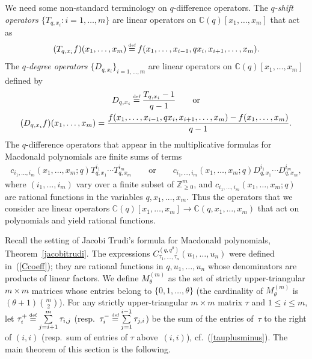 \documentclass[pdftex]{sigma}
\numberwithin{equation}{section}
\newcommand\myeq{\mathrel{\stackrel{\makebox[0pt]{\mbox{\normalfont\tiny def}}}{=}}}
\newcommand{\C}{\mathbb{C}}
\newcommand{\Z}{\mathbb{Z}}
\begin{document}
We need some non-standard terminology on $q$-dif\/ference operators. The \textit{$q$-shift operators $\{T_{q, x_i}\colon i = 1, \dots, m\}$} are linear operators on $\C(q)[x_1, \dots, x_m]$ that act as
\begin{gather*}
(T_{q, x_i}f)(x_1, \dots, x_m) \myeq f(x_1, \dots, x_{i-1}, qx_i, x_{i+1}, \dots, x_m).
\end{gather*}
The \textit{$q$-degree operators $\{D_{q, x_i}\}_{i = 1, \dots, m}$} are linear operators on $\C(q)[x_1, \dots, x_m]$ def\/ined by
\begin{gather*}
D_{q, x_i} \myeq \frac{T_{q, x_i} - 1}{q - 1} \qquad \text{or}\\
(D_{q, x_i}f)(x_1, \dots, x_m) = \frac{f(x_1, \dots, x_{i-1}, qx_i, x_{i+1}, \dots, x_m) - f(x_1, \dots, x_m)}{q - 1}.
\end{gather*}
The $q$-dif\/ference operators that appear in the multiplicative formulas for Macdonald polynomials are f\/inite sums of terms
\begin{gather*}
c_{i_1, \dots, i_m}(x_1, \dots, x_m; q)T_{q, x_1}^{i_1}\cdots T_{q, x_m}^{i_m} \qquad \text{or} \qquad c_{i_1, \dots, i_m}(x_1, \dots, x_m; q)D_{q, x_1}^{i_1}\cdots D_{q, x_m}^{i_m},
 \end{gather*} where $(i_1, \dots, i_m)$ vary over a f\/inite subset of $\Z_{\geq 0}^m$, and $c_{i_1, \dots, i_m}(x_1, \dots, x_m; q)$ are rational functions in the variables $q, x_1, \dots, x_m$. Thus the operators that we consider are linear operators $\C(q)[x_1, \dots, x_m] \longrightarrow \C(q, x_1, \dots, x_m)$ that act on polynomials and yield rational functions.

Recall the setting of Jacobi Trudi's formula for Macdonald polynomials, Theorem~\ref{jacobitrudi}. The expressions $C_{\tau_1, \dots, \tau_n}^{(q, q^{\theta})}(u_1, \dots, u_n)$ were def\/ined in~(\ref{Ccoeff}); they are rational functions in $q, u_1, \dots, u_n$ whose denominators are products of linear factors. We def\/ine $M_{\theta}^{(m)}$ as the set of strictly upper-triangular $m\times m$ matrices whose entries belong to $\{0, 1, \dots, \theta\}$ (the cardinality of $M_{\theta}^{(m)}$ is $(\theta + 1){m \choose 2}$). For any strictly upper-triangular $m\times m$ matrix $\tau$ and $1\leq i\leq m$, let $\tau_i^+ \myeq \sum\limits_{j=i+1}^m{\tau_{i, j}}$ (resp.\ $\tau_i^- \myeq \sum\limits_{j=1}^{i-1}{\tau_{j, i}}$) be the sum of the entries of~$\tau$ to the right of $(i, i)$ (resp.\ sum of entries of $\tau$ above~$(i, i)$), cf.~(\ref{tauplusminus}). The main theorem of this section is the following.
\end{document}
